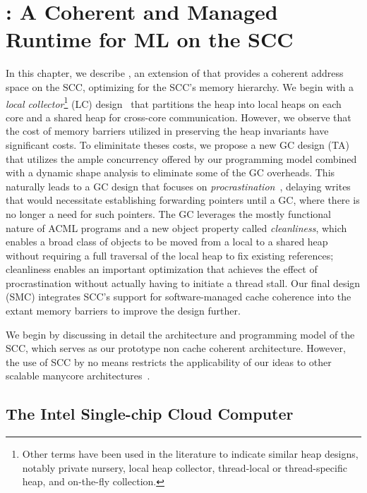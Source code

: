 \newcommand{\lc}{LC}
\newcommand{\ta}{TA}
\newcommand{\smc}{SMC}
\newcommand{\kcore}{k_{core}}
\newcommand{\kmesh}{k_{mesh}}
\newcommand{\kram}{k_{ram}}

\chapter{\MMSCC: A Coherent and Managed Runtime for ML on the SCC}
\label{chap:aneris}

In this chapter, we describe \MMSCC, an extension of \MM that provides a
coherent address space on the SCC, optimizing for the SCC's memory hierarchy.
We begin with a \emph{local collector}\footnote{Other terms have been used in
the literature to indicate similar heap designs, notably private nursery, local
heap collector, thread-local or thread-specific heap, and on-the-fly
collection.} (\lc) design~\cite{} that partitions the heap into local heaps on
each core and a shared heap for cross-core communication. However, we observe
that the cost of memory barriers utilized in preserving the heap invariants
have significant costs. To eliminitate theses costs, we propose a new GC design
(\ta) that utilizes the ample concurrency offered by our programming model
combined with a dynamic shape analysis to eliminate some of the GC overheads.
This naturally leads to a GC design that focuses on
\emph{procrastination}~\cite{mmgc}, delaying writes that would necessitate
establishing forwarding pointers until a GC, where there is no longer a need
for such pointers. The GC leverages the mostly functional nature of ACML
programs and a new object property called \emph{cleanliness}, which enables a
broad class of objects to be moved from a local to a shared heap without
requiring a full traversal of the local heap to fix existing references;
cleanliness enables an important optimization that achieves the effect of
procrastination without actually having to initiate a thread stall. Our final
design (\smc) integrates SCC's support for software-managed cache coherence
into the extant memory barriers to improve the design further.

We begin by discussing in detail the architecture and programming model of the
SCC, which serves as our prototype non cache coherent architecture. However,
the use of SCC by no means restricts the applicability of our ideas to other
scalable manycore architectures~\cite{mmgc}.

\section{The Intel Single-chip Cloud Computer}


